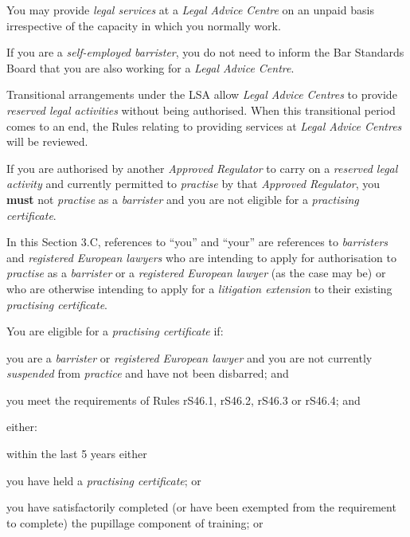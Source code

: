 You may provide \emph{legal services} at a \emph{Legal Advice Centre} on
an unpaid basis irrespective of the capacity in which you normally work.


If you are a \emph{self-employed barrister}, you do not need to inform
the Bar Standards Board that you are also working for a \emph{Legal
Advice Centre}.


Transitional arrangements under the LSA allow \emph{Legal Advice
Centres} to provide \emph{reserved legal activities} without being
authorised. When this transitional period comes to an end, the Rules
relating to providing services at \emph{Legal Advice Centres} will be
reviewed.




If you are authorised by another \emph{Approved Regulator} to carry on a
\emph{reserved legal activity} and currently permitted to
\emph{practise} by that \emph{Approved Regulator}, you \textcolor{myred}{\textbf{must }}not
\emph{practise} as a \emph{barrister} and you are not eligible for a
\emph{practising certificate}.







In this Section 3.C, references to ``you'' and ``your'' are references
to \emph{barristers} and \emph{registered European lawyers} who are
intending to apply for authorisation to \emph{practise} as a
\emph{barrister} or a \emph{registered European lawyer} (as the case may
be) or who are otherwise intending to apply for a \emph{litigation
extension} to their existing \emph{practising certificate}.


You are eligible for a \emph{practising certificate} if:\nl\item you are a \emph{barrister} or \emph{registered European lawyer} and
you are not currently \emph{suspended} from \emph{practice} and have not
been disbarred; and
\item you meet the requirements of Rules rS46.1, rS46.2, rS46.3 or rS46.4;
and
\item either:
\al
\item  within the last 5 years either \rl 
\item  you have held a \emph{practising
certificate}; or 
\item you have satisfactorily completed (or have been
exempted from the requirement to complete) the pupillage component of
training; or\lr

